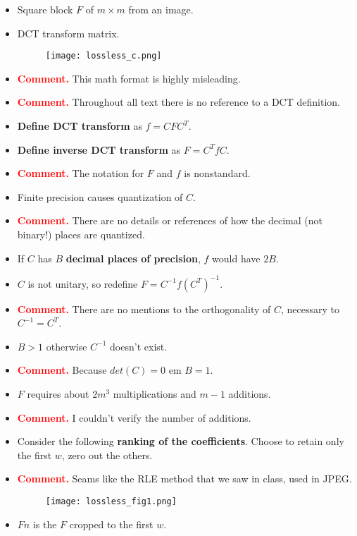 \documentclass[10pt, twoside, twocolumn]{paper} %
\begin{document}
\begin{itemize}[noitemsep]
  \item Square block $F$ of $m\times m$ from an image.
  \item DCT transform matrix.
  \begin{figure}[H]
    \centering
    \texttt{[image: lossless\_c.png]}
  \end{figure}
  \item\textcolor{red}{\textbf{Comment.}} This math format is highly misleading.
  \item\textcolor{red}{\textbf{Comment.}} Throughout all text there is no reference to a DCT definition.
  \item \textbf{Define DCT transform} as $f=CFC^T$.
  \item \textbf{Define inverse DCT transform} as $F=C^TfC$.
  \item\textcolor{red}{\textbf{Comment.}} The notation for $F$ and $f$ is nonstandard.
  \item Finite precision causes quantization of $C$.
  \item\textcolor{red}{\textbf{Comment.}} There are no details or references of how the decimal (not binary!) places are quantized.
  \item If $C$ has $B$ \textbf{decimal places of precision}, $f$ would have $2B$.
  \item $C$ is not unitary, so redefine $F=C^{-1}f(C^T)^{-1}$.
  \item\textcolor{red}{\textbf{Comment.}} There are no mentions to the orthogonality of $C$, necessary to $C^{-1}=C^T$.
  \item $B>1$ otherwise $C^{-1}$ doesn't exist.
  \item\textcolor{red}{\textbf{Comment.}} Because $det(C)=0$ em $B=1$.
  \item $F$ requires about $2m^3$ multiplications and $m-1$ additions.
  \item\textcolor{red}{\textbf{Comment.}} I couldn't verify the number of additions.
  \item Consider the following \textbf{ranking of the coefficients}. Choose to retain only the first $w$, zero out the others.
  \item\textcolor{red}{\textbf{Comment.}} Seams like the RLE method that we saw in class, used in JPEG.
  \begin{figure}[H]
    \centering
    \texttt{[image: lossless\_fig1.png]}
  \end{figure}
  \item $Fn$ is the $F$ cropped to the first $w$.

\end{itemize}
\end{document}
